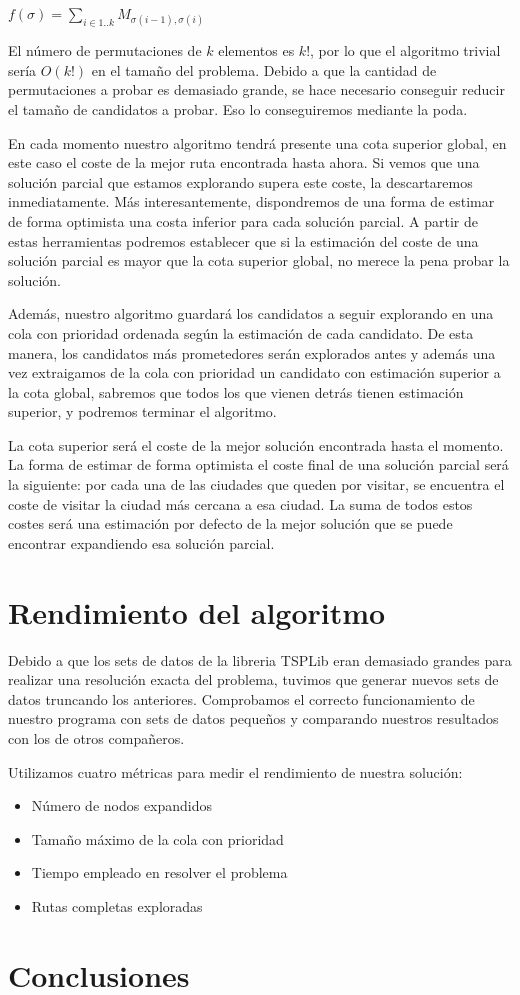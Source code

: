 \documentclass[a4paper, 11pt]{article}
\begin{document}
$f(\sigma) = \sum_{i \in 1..k}{M_{\sigma(i - 1), \sigma(i)}}$

El número de permutaciones de $k$ elementos es $k!$, por lo que el algoritmo trivial sería $O(k!)$ en el tamaño del problema. Debido a que la cantidad de permutaciones a probar es demasiado grande, se hace necesario conseguir reducir el tamaño de candidatos a probar. Eso lo conseguiremos mediante la poda.

En cada momento nuestro algoritmo tendrá presente una cota superior global, en este caso el coste de la mejor ruta encontrada hasta ahora. Si vemos que una solución parcial que estamos explorando supera este coste, la descartaremos inmediatamente. Más interesantemente, dispondremos de una forma de estimar de forma optimista una costa inferior para cada solución parcial. A partir de estas herramientas podremos establecer que si la estimación del coste de una solución parcial es mayor que la cota superior global, no merece la pena probar la solución.

Además, nuestro algoritmo guardará los candidatos a seguir explorando en una cola con prioridad ordenada según la estimación de cada candidato. De esta manera, los candidatos más prometedores serán explorados antes y además una vez extraigamos de la cola con prioridad un candidato con estimación superior a la cota global, sabremos que todos los que vienen detrás tienen estimación superior, y podremos terminar el algoritmo.

La cota superior será el coste de la mejor solución encontrada hasta el momento. La forma de estimar de forma optimista el coste final de una solución parcial será la siguiente: por cada una de las ciudades que queden por visitar, se encuentra el coste de visitar la ciudad más cercana a esa ciudad. La suma de todos estos costes será una estimación por defecto de la mejor solución que se puede encontrar expandiendo esa solución parcial.


\section{Rendimiento del algoritmo}
Debido a que los sets de datos de la libreria TSPLib eran demasiado grandes para realizar una resolución exacta del problema, tuvimos que generar nuevos sets de datos truncando los anteriores. Comprobamos el correcto funcionamiento de nuestro programa con sets de datos pequeños y comparando nuestros resultados con los de otros compañeros. 

Utilizamos cuatro métricas para medir el rendimiento de nuestra solución:
\begin{itemize}
  \item Número de nodos expandidos
  \item Tamaño máximo de la cola con prioridad
  \item Tiempo empleado en resolver el problema
  \item Rutas completas exploradas
\end{itemize}

\section{Conclusiones}
\end{document}
